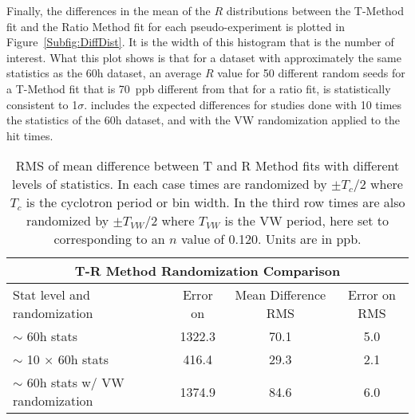 
Finally, the differences in the mean of the $R$ distributions between the T-Method fit and the Ratio Method fit for each pseudo-experiment is plotted in Figure~\ref{Subfig:DiffDist}. It is the width of this histogram that is the number of interest. What this plot shows is that for a dataset with approximately the same statistics as the 60h dataset, an average $R$ value for 50 different random seeds for a T-Method fit that is \SI{70}{ppb} different from that for a ratio fit, is statistically consistent to 1$\sigma$.  includes the expected differences for studies done with 10 times the statistics of the 60h dataset, and with the VW randomization applied to the hit times.




\begin{table}
\centering
\small
\renewcommand{\arraystretch}{1.2}
\begin{tabular*}{1\linewidth}{@{\extracolsep{\fill}}lccc}
  \hline
    \multicolumn{4}{c}{\textbf{T-R Method Randomization Comparison}} \\
  \hline\hline
    Stat level and randomization & Error on \R & Mean Difference RMS & Error on RMS \\
  \hline
    $\sim$ 60h stats & 1322.3 & 70.1 & 5.0 \\
    $\sim$ 10 $\times$ 60h stats & 416.4 & 29.3 & 2.1 \\
    $\sim$ 60h stats w/ VW randomization & 1374.9 & 84.6 & 6.0 \\
  \hline
\end{tabular*}
\caption[T-R Method randomization comparison]{RMS of mean difference between T and R Method fits with different levels of statistics. In each case times are randomized by $\pm T_{c}/2$ where $T_{c}$ is the cyclotron period or bin width. In the third row times are also randomized by $\pm T_{VW}/2$ where $T_{VW}$ is the VW period, here set to  corresponding to an $n$ value of 0.120. Units are in ppb.}
\label{tab:TRRandomizationComparison}
\end{table}



